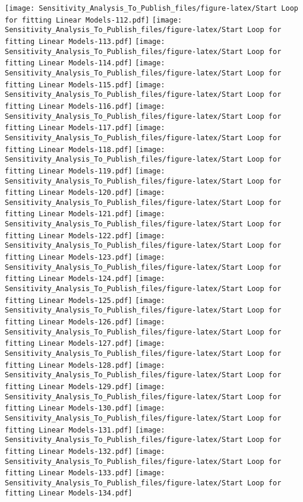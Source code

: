 \documentclass[
]{article}
\begin{document}
\texttt{[image: Sensitivity\_Analysis\_To\_Publish\_files/figure-latex/Start Loop for fitting Linear Models-112.pdf]}
\texttt{[image: Sensitivity\_Analysis\_To\_Publish\_files/figure-latex/Start Loop for fitting Linear Models-113.pdf]}
\texttt{[image: Sensitivity\_Analysis\_To\_Publish\_files/figure-latex/Start Loop for fitting Linear Models-114.pdf]}
\texttt{[image: Sensitivity\_Analysis\_To\_Publish\_files/figure-latex/Start Loop for fitting Linear Models-115.pdf]}
\texttt{[image: Sensitivity\_Analysis\_To\_Publish\_files/figure-latex/Start Loop for fitting Linear Models-116.pdf]}
\texttt{[image: Sensitivity\_Analysis\_To\_Publish\_files/figure-latex/Start Loop for fitting Linear Models-117.pdf]}
\texttt{[image: Sensitivity\_Analysis\_To\_Publish\_files/figure-latex/Start Loop for fitting Linear Models-118.pdf]}
\texttt{[image: Sensitivity\_Analysis\_To\_Publish\_files/figure-latex/Start Loop for fitting Linear Models-119.pdf]}
\texttt{[image: Sensitivity\_Analysis\_To\_Publish\_files/figure-latex/Start Loop for fitting Linear Models-120.pdf]}
\texttt{[image: Sensitivity\_Analysis\_To\_Publish\_files/figure-latex/Start Loop for fitting Linear Models-121.pdf]}
\texttt{[image: Sensitivity\_Analysis\_To\_Publish\_files/figure-latex/Start Loop for fitting Linear Models-122.pdf]}
\texttt{[image: Sensitivity\_Analysis\_To\_Publish\_files/figure-latex/Start Loop for fitting Linear Models-123.pdf]}
\texttt{[image: Sensitivity\_Analysis\_To\_Publish\_files/figure-latex/Start Loop for fitting Linear Models-124.pdf]}
\texttt{[image: Sensitivity\_Analysis\_To\_Publish\_files/figure-latex/Start Loop for fitting Linear Models-125.pdf]}
\texttt{[image: Sensitivity\_Analysis\_To\_Publish\_files/figure-latex/Start Loop for fitting Linear Models-126.pdf]}
\texttt{[image: Sensitivity\_Analysis\_To\_Publish\_files/figure-latex/Start Loop for fitting Linear Models-127.pdf]}
\texttt{[image: Sensitivity\_Analysis\_To\_Publish\_files/figure-latex/Start Loop for fitting Linear Models-128.pdf]}
\texttt{[image: Sensitivity\_Analysis\_To\_Publish\_files/figure-latex/Start Loop for fitting Linear Models-129.pdf]}
\texttt{[image: Sensitivity\_Analysis\_To\_Publish\_files/figure-latex/Start Loop for fitting Linear Models-130.pdf]}
\texttt{[image: Sensitivity\_Analysis\_To\_Publish\_files/figure-latex/Start Loop for fitting Linear Models-131.pdf]}
\texttt{[image: Sensitivity\_Analysis\_To\_Publish\_files/figure-latex/Start Loop for fitting Linear Models-132.pdf]}
\texttt{[image: Sensitivity\_Analysis\_To\_Publish\_files/figure-latex/Start Loop for fitting Linear Models-133.pdf]}
\texttt{[image: Sensitivity\_Analysis\_To\_Publish\_files/figure-latex/Start Loop for fitting Linear Models-134.pdf]}
\end{document}
